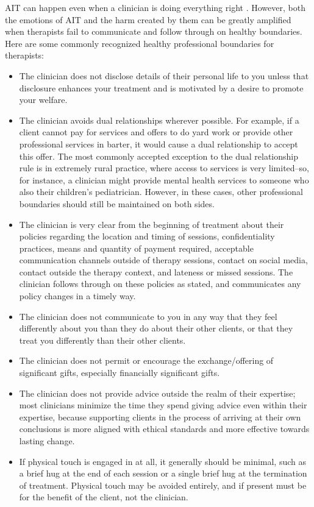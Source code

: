 \documentclass[12pt,letterpaper]{book}
\begin{document}
AIT can happen even when a clinician is doing everything right \cite{transferranceLoveHarm}. However, both the emotions of AIT and the harm created by them can be greatly amplified when therapists fail to communicate and follow through on healthy boundaries. Here are some commonly recognized healthy professional boundaries for therapists:
\begin{itemize}
    \item The clinician does not disclose details of their personal life to you unless that disclosure enhances your treatment and is motivated by a desire to promote your welfare.
    \item The clinician avoids dual relationships wherever possible. For example, if a client cannot pay for services and offers to do yard work or provide other professional services in barter, it would cause a dual relationship to accept this offer. The most commonly accepted exception to the dual relationship rule is in extremely rural practice, where access to services is very limited–so, for instance, a clinician might provide mental health services to someone who also their children's pediatrician. However, in these cases, other professional boundaries should still be maintained on both sides.
    \item The clinician is very clear from the beginning of treatment about their policies regarding the location and timing of sessions, confidentiality practices, means and quantity of payment required, acceptable communication channels outside of therapy sessions, contact on social media, contact outside the therapy context, and lateness or missed sessions. The clinician follows through on these policies as stated, and communicates any policy changes in a timely way.
    \item The clinician does not communicate to you in any way that they feel differently about you than they do about their other clients, or that they treat you differently than their other clients.
    \item The clinician does not permit or encourage the exchange/offering of significant gifts, especially financially significant gifts.
    \item The clinician does not provide advice outside the realm of their expertise; most clinicians minimize the time they spend giving advice even within their expertise, because supporting clients in the process of arriving at their own conclusions is more aligned with ethical standards and more effective towards lasting change.
    \item If physical touch is engaged in at all, it generally should be minimal, such as a brief hug at the end of each session or a single brief hug at the termination of treatment. Physical touch may be avoided entirely, and if present must be for the benefit of the client, not the clinician.

\end{itemize}
\end{document}
